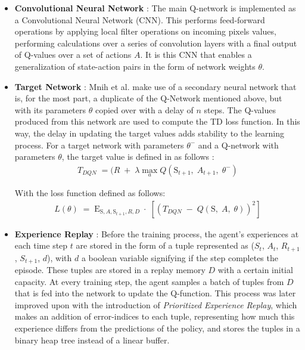 \documentclass[10pt,journal,compsoc]{IEEEtran}
\begin{document}
\begin{itemize}
\item \textbf{Convolutional Neural Network} : 
The main Q-network is implemented as a Convolutional Neural Network (CNN). This performs feed-forward operations by applying local filter operations on incoming pixels values, performing calculations over a series of convolution layers with a final output of Q-values over a set of actions \(A\). It is this CNN that enables a generalization of state-action pairs in the form of network weights \(\theta\).\linebreak

\item \textbf{Target Network} :
Mnih et al. make use of a secondary neural network that is, for the most part, a duplicate of the Q-Network mentioned above, but with its parameters \(\theta\) copied over with a delay of $n$ steps. The Q-values produced from this network are used to compute the TD loss function. In this way, the delay in updating the target values adds stability to the learning process. For a target network with parameters \(\theta ^{-}\) and a Q-network with parameters \(\theta\), the target value is defined in \cite{deepqlearning} as follows :
\begin{align*}
T_{DQN}\; = ( R\; +\; \lambda \max _{a}Q\left( \mbox{S}_{t+1},\; A_{t+1},\; \theta ^{-} \right)
\end{align*}

With the loss function defined as follows:
\begin{align*}
L\left( \theta  \right)\; =\; \mbox{E}_{\mbox{S},A,\mbox{S}_{t+1},R,D}\; \cdot \; \left[ \left(T_{DQN}\; -\; Q\left( \mbox{S},\; A,\; \theta  \right) \right)^{2}\right]
\end{align*}

\item \textbf{Experience Replay} : Before the training process, the agent's experiences at each time step $t$ are stored in the form of a tuple represented as (\({{S}}_{{t}}\), \({{A}}_{{t}}\), \({{R}}_{{t+1}}\), \({{S}}_{{t+1}}\), \(d\)), with \(d\) a boolean variable signifying if the step completes the episode. These tuples are stored in a replay memory \(D\) with a certain initial capacity. At every training step, the agent samples a batch of tuples from \(D\) that is fed into the network to update the Q-function. This process was later improved upon with the introduction of \textit{Prioritized Experience Replay}\cite{per}, which makes an addition of error-indices to each tuple, representing how much this experience differs from the predictions of the policy, and stores the tuples in a binary heap tree instead of a linear buffer.
\end{itemize}
\end{document}
